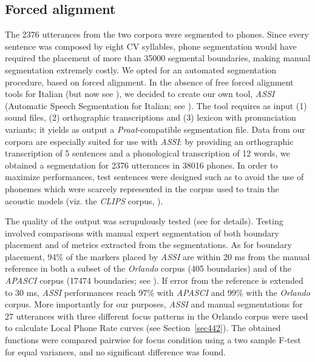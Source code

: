 \subsection{Forced alignment}\label{sec422}
The 2376 utterances from the two corpora were segmented to phones. Since every sentence was composed by eight CV syllables, phone segmentation would have required the placement of more than 35000 segmental boundaries, making manual segmentation extremely costly. We opted for an automated segmentation procedure, based on forced alignment. In the absence of free forced alignment tools for Italian (but now see \citealt{bigi2012speech}), we decided to create our own tool, \textit{ASSI} (Automatic Speech Segmentation for Italian; see \citealt{cangemi2011automatic}). The tool requires as input (1) sound files, (2) orthographic transcriptions and (3) lexicon with pronunciation variants; it yields as output a \textit{Praat}-compatible segmentation file. Data from our corpora are especially suited for use with \textit{ASSI}: by providing an orthographic transcription of 5 sentences and a phonological transcription of 12 words, we obtained a segmentation for 2376 utterances in 38016 phones. In order to maximize performances, test sentences were designed such as to avoid the use of phonemes which were scarcely represented in the corpus used to train the acoustic models (viz. the \textit{CLIPS} corpus, \citealt{savy2009clips}). 

The quality of the output was scrupulously tested (see \citealt{cangemi2011automatic} for details). Testing involved comparisons with manual expert segmentation of both boundary placement and of metrics extracted from the segmentations. As for boundary placement, 94\% of the markers placed by \textit{ASSI} are within 20 ms from the manual reference in both a subset of the \textit{Orlando} corpus (405 boundaries) and  of the \textit{APASCI} corpus (17474 boundaries; see \citealt{angelini1993baseline}). If error from the reference is extended to 30 ms, \textit{ASSI} performances reach 97\% with \textit{APASCI} and 99\% with the \textit{Orlando} corpus. More importantly for our purposes, \textit{ASSI} and manual segmentations for 27 utterances with three different focus patterns in the Orlando corpus were used to calculate Local Phone Rate curves (see Section~\ref{sec442}). The obtained functions were compared pairwise for focus condition using a two sample F-test for equal variances, and no significant difference was found.

